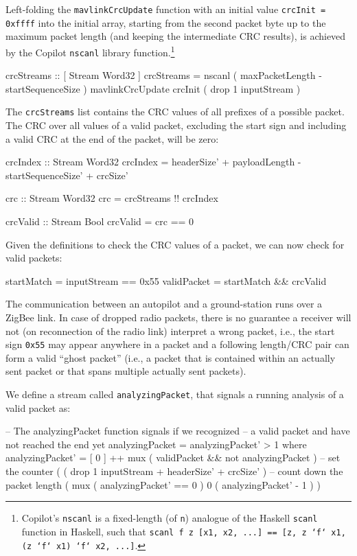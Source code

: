 Left-folding the {\tt mavlinkCrcUpdate} function with an initial value
{\tt crcInit = 0xffff} into the initial array, starting from the second
packet byte up to the maximum packet length (and keeping the intermediate
CRC results), is achieved by the Copilot {\tt nscanl} library
function.\footnote{Copilot's {\tt nscanl} is a fixed-length (of {\tt n}) analogue
  of the Haskell {\tt scanl} function in Haskell, such that
{\tt scanl f z [x1, x2, ...] == [z, z `f` x1, (z `f` x1) `f` x2,
    ...]}.}


\begin{code}
crcStreams :: [ Stream Word32 ]
crcStreams = nscanl
             ( maxPacketLength - startSequenceSize )
             mavlinkCrcUpdate crcInit
             ( drop 1 inputStream )
\end{code}


The {\tt crcStreams} list contains the CRC values of all prefixes of a possible
packet. The CRC over all values of a valid packet, excluding the start sign and
including a valid CRC at the end of the packet, will be zero:


\begin{code}
crcIndex :: Stream Word32
crcIndex = headerSize' + payloadLength
      - startSequenceSize' + crcSize'

crc :: Stream Word32
crc = crcStreams !! crcIndex

crcValid :: Stream Bool
crcValid = crc == 0
\end{code}


Given the definitions to check the CRC values of a packet, we can now
check for valid packets:


\begin{code}
startMatch  = inputStream == 0x55
validPacket = startMatch && crcValid
\end{code}


The communication between an autopilot and a ground-station runs over
a ZigBee link. In case of dropped radio packets, there is no guarantee
a receiver will not (on reconnection of the radio link) interpret a
wrong packet, i.e., the start sign {\tt 0x55} may appear anywhere
in a packet and a following length/CRC pair can form a valid ``ghost
packet'' (i.e., a packet that is contained within an actually sent packet or that spans
multiple actually sent packets).

We define a stream called {\tt analyzingPacket}, that signals a running
analysis of a valid packet as:

\begin{code}
-- The analyzingPacket function signals if we recognized
-- a valid packet and have not reached the end yet
analyzingPacket = analyzingPacket' > 1
  where analyzingPacket' = [ 0 ] ++ mux
               ( validPacket && not analyzingPacket )
                -- set the counter
               ( ( drop 1 inputStream
                   + headerSize'
                   + crcSize' )
                 -- count down the packet length
                 ( mux ( analyzingPacket' == 0 )
                     0
                     ( analyzingPacket' - 1 ) )
\end{code}

